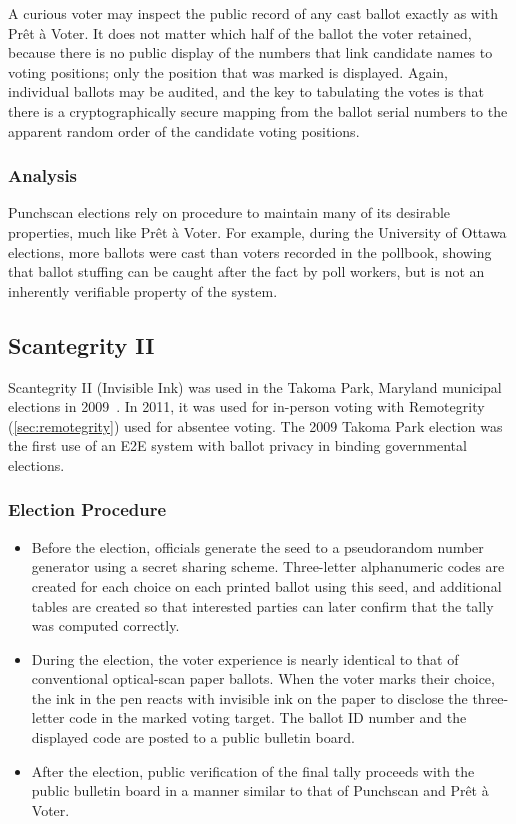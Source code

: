 A curious voter may inspect the public record of any cast ballot
exactly as with Prêt à Voter. It does not matter which half of the
ballot the voter retained, because there is no public display of the
numbers that link candidate names to voting positions; only the
position that was marked is displayed. Again, individual ballots may
be audited, and the key to tabulating the votes is that there is a
cryptographically secure mapping from the ballot serial numbers to the
apparent random order of the candidate voting positions.

\subsubsection{Analysis}

Punchscan elections rely on procedure to maintain many of its
desirable properties, much like Prêt à Voter. For example, during the
University of Ottawa elections, more ballots were cast than voters
recorded in the pollbook, showing that ballot stuffing can be caught
after the fact by poll workers, but is not an inherently verifiable
property of the system.


\subsection{Scantegrity II~\cite{chaum2008,chaum2009}}
\label{sec:scantegrity-ii}

Scantegrity II (Invisible Ink) was used in the Takoma Park, Maryland
municipal elections in 2009~\cite{carback2010}. In 2011, it was used
for in-person voting with Remotegrity (\ref{sec:remotegrity}) used for
absentee voting. The 2009 Takoma Park election was the first use of an
E2E system with ballot privacy in binding governmental elections.

\subsubsection{Election Procedure}

\begin{itemize}

\item Before the election, officials generate the seed to a
  pseudorandom number generator using a secret sharing
  scheme. Three-letter alphanumeric codes are created for each choice
  on each printed ballot using this seed, and additional tables are
  created so that interested parties can later confirm that the tally
  was computed correctly.

\item During the election, the voter experience is nearly identical to
  that of conventional optical-scan paper ballots. When the voter
  marks their choice, the ink in the pen reacts with invisible ink on
  the paper to disclose the three-letter code in the marked voting
  target. The ballot ID number and the displayed code are posted to a
  public bulletin board.

\item After the election, public verification of the final tally
  proceeds with the public bulletin board in a manner similar to that
  of Punchscan and Prêt à Voter.

\end{itemize}
